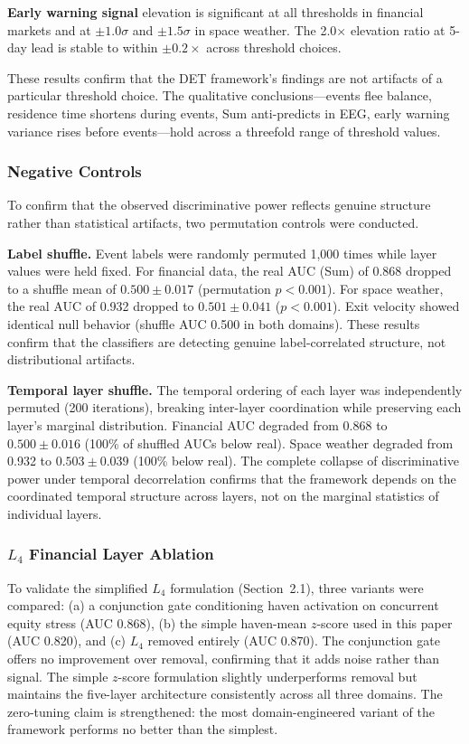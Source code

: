 \documentclass[aip,cha,reprint,amsmath,amssymb,final,floatfix]{revtex4-2}
\begin{document}
\textbf{Early warning signal} elevation is significant at all thresholds in financial markets and at $\pm 1.0\sigma$ and $\pm 1.5\sigma$ in space weather. The 2.0$\times$ elevation ratio at 5-day lead is stable to within $\pm 0.2\times$ across threshold choices.

These results confirm that the DET framework's findings are not artifacts of a particular threshold choice. The qualitative conclusions---events flee balance, residence time shortens during events, Sum anti-predicts in EEG, early warning variance rises before events---hold across a threefold range of threshold values.

\subsubsection{Negative Controls}

To confirm that the observed discriminative power reflects genuine structure rather than statistical artifacts, two permutation controls were conducted.

\textbf{Label shuffle.} Event labels were randomly permuted 1,000 times while layer values were held fixed. For financial data, the real AUC (Sum) of 0.868 dropped to a shuffle mean of $0.500 \pm 0.017$ (permutation $p < 0.001$). For space weather, the real AUC of 0.932 dropped to $0.501 \pm 0.041$ ($p < 0.001$). Exit velocity showed identical null behavior (shuffle AUC 0.500 in both domains). These results confirm that the classifiers are detecting genuine label-correlated structure, not distributional artifacts.

\textbf{Temporal layer shuffle.} The temporal ordering of each layer was independently permuted (200 iterations), breaking inter-layer coordination while preserving each layer's marginal distribution. Financial AUC degraded from 0.868 to $0.500 \pm 0.016$ (100\% of shuffled AUCs below real). Space weather degraded from 0.932 to $0.503 \pm 0.039$ (100\% below real). The complete collapse of discriminative power under temporal decorrelation confirms that the framework depends on the coordinated temporal structure across layers, not on the marginal statistics of individual layers.

\subsubsection{\label{sec:l4ablation}$L_4$ Financial Layer Ablation}

To validate the simplified $L_4$ formulation (Section~2.1), three variants were compared: (a) a conjunction gate conditioning haven activation on concurrent equity stress (AUC 0.868), (b) the simple haven-mean $z$-score used in this paper (AUC 0.820), and (c) $L_4$ removed entirely (AUC 0.870). The conjunction gate offers no improvement over removal, confirming that it adds noise rather than signal. The simple $z$-score formulation slightly underperforms removal but maintains the five-layer architecture consistently across all three domains. The zero-tuning claim is strengthened: the most domain-engineered variant of the framework performs no better than the simplest.
\end{document}
